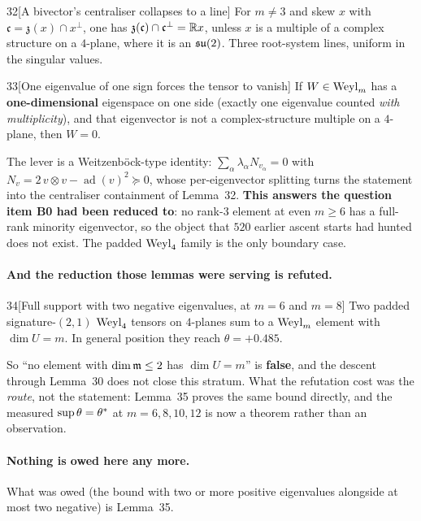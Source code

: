 \begin{Lem}{32}[A bivector's centraliser collapses to a line]
For $m\ne3$ and skew $x$ with $\mathfrak c=\mathfrak z(x)\cap x^\perp$, one has $\mathfrak z(\mathfrak c)\cap\mathfrak c^\perp=\mathbb{R} x$, unless $x$ is a multiple of a complex structure on a $4$-plane, where it is an $\mathfrak{su}(2)$. Three root-system lines, uniform in the singular values.
\end{Lem}

\begin{Lem}{33}[One eigenvalue of one sign forces the tensor to vanish]
If $W\in\mathrm{Weyl}_m$ has a \textbf{one-dimensional} eigenspace on one side (exactly one eigenvalue counted \emph{with multiplicity}), and that eigenvector is not a complex-structure multiple on a $4$-plane, then $W=0$.
\end{Lem}

The lever is a Weitzenb\"ock-type identity: $\sum_\alpha\lambda_\alpha N_{v_\alpha}=0$ with $N_v=2\,v\otimes v-\operatorname{ad}(v)^2\succeq0$, whose per-eigenvector splitting turns the statement into the centraliser containment of Lemma~32. \textbf{This answers the question item B0 had been reduced to}: no rank-$3$ element at even $m\ge6$ has a full-rank minority eigenvector, so the object that $520$ earlier ascent starts had hunted does not exist. The padded $\mathrm{Weyl}_4$ family is the only boundary case.

\paragraph{And the reduction those lemmas were serving is refuted.}

\begin{Lem}{34}[Full support with two negative eigenvalues, at $m=6$ and $m=8$]
Two padded signature-$(2,1)$ $\mathrm{Weyl}_4$ tensors on $4$-planes sum to a $\mathrm{Weyl}_m$ element with $\dim U=m$. In general position they reach $\theta=+0.485$.
\end{Lem}

So ``no element with $\dim\mathfrak{m}\le2$ has $\dim U=m$'' is \textbf{false}, and the descent through Lemma~30 does not close this stratum. What the refutation cost was the \emph{route}, not the statement: Lemma~35 proves the same bound directly, and the measured $\sup\theta=\theta^{*}$ at $m=6,8,10,12$ is now a theorem rather than an observation.

\paragraph{Nothing is owed here any more.} What was owed (the bound with two or more positive eigenvalues alongside at most two negative) is Lemma~35.


